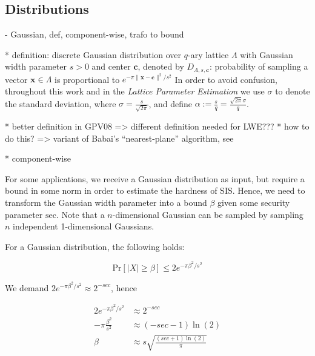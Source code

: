 \documentclass[
  a4paper,  %
  twoside,  %
  bibliography=totoc,
  headsepline,
  cleardoublepage=empty,
  parskip=half,
  draft=false
]{scrbook}
\begin{document}
\subsection{Distributions}

  - Gaussian, def, component-wise, trafo to bound %

    * definition:
      discrete Gaussian distribution over $q$-ary lattice $\Lambda$ with Gaussian width parameter $s > 0$ and center $\mathbf{c}$, denoted by $D_{\Lambda, s, \mathbf{c}}$: probability of sampling a vector $\mathbf{x}\in \Lambda$ is proportional to $e^{-\pi \|\mathbf{x} - \mathbf{c}\|^2/s^2}$ %
      In order to avoid confusion, throughout this work and in the \textit{Lattice Parameter Estimation} we use $\sigma$ to denote the standard deviation, where $\sigma = \frac{s}{\sqrt{2 \pi}}$, and define $\alpha := \frac{s}{q} = \frac{\sqrt{2\pi} \sigma}{q}$. 

    * better definition in GPV08 => different definition needed for LWE??? %
    * how to do this? => variant of Babai's ``nearest-plane'' algorithm, see \cite{GPV08} %

    * component-wise
    

    For some applications, we receive a Gaussian distribution as input, but require a bound in some norm in order to estimate the hardness of SIS. Hence, we need to transform the Gaussian width parameter into a bound $\beta$ given some security parameter $\text{sec}$. Note that a $n$-dimensional Gaussian can be sampled by sampling $n$ independent 1-dimensional Gaussians. %
        
    For a Gaussian distribution, the following holds: %
    
    \begin{equation}
      \text{Pr}\left[ |X| \geq \beta \right] \leq 2 e^{-\pi \beta^2/s^2}
    \end{equation}
    
    We demand $2 e^{-\pi \beta^2/s^2} \approx 2^{-sec}$, hence
    
    \begin{align*}
      2 e^{-\pi \beta^2/s^2} &\approx 2^{-sec}\\
      -\pi \frac{\beta^2}{s^2} &\approx (-sec - 1)\ln (2)\\
      \beta  &\approx s \sqrt{\frac{(sec + 1) \ln(2)}{\pi}}
    \end{align*}
\end{document}
